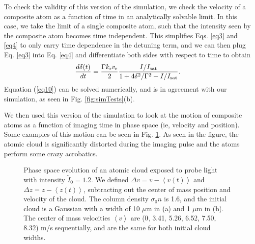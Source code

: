 To check the validity of this version of the simulation, we check the velocity of a composite atom as a function of time in an analytically solvable limit. In this case, we take the limit of a single composite atom, such that the intensity seen by the composite atom becomes time independent. This simplifies  Eqs. \ref{eq3} and \ref{eq4} to only carry time dependence in the detuning term, and we can then plug Eq. \ref{eq3} into Eq. \ref{eq4} and differentiate both sides with respect to time to obtain
%
\begin{equation}
\frac{d\delta(t)}{dt}= \frac{\Gamma k_{\rm{r}} v_{\rm{r}}}{2} \frac{I/I_{\rm{sat}}}{1+4\delta^2/\Gamma^2+I/I_{\rm{sat}}}.
\label{eq10}
\end{equation}
Equation (\ref{eq10}) can be solved numerically, and is in agreement with our simulation, as seen in Fig. \ref{fig:simTests}(b).


We then used this version of the simulation to look at the motion of composite atoms as a function of imaging time in phase space (ie, velocity and position). Some examples of this motion can be seen in  Fig. \ref{fig:phaseSpace}. As seen in the figure, the atomic cloud is significantly distorted during the imaging pulse and the atoms perform some crazy acrobatics. 
\begin{figure}
\caption{Phase space evolution of an atomic cloud exposed to probe light with intensity $\tilde{I}_0=1.2$. We defined $\Delta v=v -\left< v(t) \right>$  and $\Delta z=z-\left< z(t) \right>$, subtracting out the center of mass position and velocity of the cloud. The column density $\sigma_0 n$ is 1.6, and the initial cloud is a Gaussian with a width of 10 $\mu$m in (a) and 1 $\mu$m in (b). The center of mass velocities $\left< v\right>$ are (0,  3.41, 5.26, 6.52, 7.50, 8.32) m/s sequentially, and are the same for both initial cloud widths. }
\label{fig:phaseSpace}
\end{figure}


